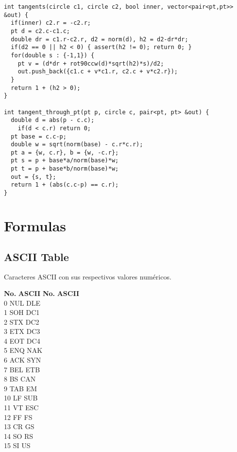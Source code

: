 \documentclass[10pt,letterpaper,twocolumn,twosided]{article}
\begin{document}
\begin{lstlisting}
int tangents(circle c1, circle c2, bool inner, vector<pair<pt,pt>> &out) {
  if(inner) c2.r = -c2.r;
  pt d = c2.c-c1.c;
  double dr = c1.r-c2.r, d2 = norm(d), h2 = d2-dr*dr;
  if(d2 == 0 || h2 < 0) { assert(h2 != 0); return 0; }
  for(double s : {-1,1}) {
    pt v = (d*dr + rot90ccw(d)*sqrt(h2)*s)/d2;
    out.push_back({c1.c + v*c1.r, c2.c + v*c2.r});
  }
  return 1 + (h2 > 0);
}

int tangent_through_pt(pt p, circle c, pair<pt, pt> &out) {
  double d = abs(p - c.c);
	if(d < c.r) return 0;
  pt base = c.c-p;
  double w = sqrt(norm(base) - c.r*c.r);
  pt a = {w, c.r}, b = {w, -c.r};
  pt s = p + base*a/norm(base)*w;
  pt t = p + base*b/norm(base)*w;
  out = {s, t};
  return 1 + (abs(c.c-p) == c.r);
}
\end{lstlisting}

\section{Formulas}

\subsection{ASCII Table}

Caracteres ASCII con sus respectivos valores numéricos.

\begin{tabbing}
\textbf{No.}\hspace{1cm} \=  \textbf{ASCII}\hspace{2cm} \= \textbf{No.}\hspace{1cm} \= \textbf{ASCII}\hspace{2cm}  \\ 
0 \> NUL  \> DLE \\
1 \> SOH  \> DC1 \\
2 \> STX  \> DC2 \\
3 \> ETX  \> DC3 \\
4 \> EOT  \> DC4 \\
5 \> ENQ  \> NAK \\
6 \> ACK  \> SYN \\
7 \> BEL  \> ETB \\
8 \> BS  \> CAN \\
9 \> TAB  \> EM \\
10 \> LF  \> SUB \\
11 \> VT  \> ESC \\
12 \> FF  \> FS \\
13 \> CR  \> GS \\
14 \> SO  \> RS \\
15 \> SI  \> US \\ 
\end{tabbing}
\end{document}
